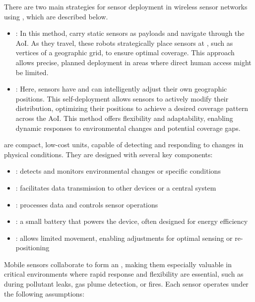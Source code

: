 \documentclass[a4paper, 12pt]{report}
\begin{document}
    There are two main strategies for sensor deployment in wireless sensor networks using , which are described below.

    \begin{itemize}
        \item {}: In this method,  carry static sensors as payloads and navigate through the AoI. As they travel, these robots strategically place sensors at , such as vertices of a geographic grid, to ensure optimal coverage. This approach allows precise, planned deployment in areas where direct human access might be limited.
        \item {}: Here, sensors have  and can intelligently adjust their own geographic positions. This self-deployment allows sensors to actively modify their distribution, optimizing their positions to achieve a desired coverage pattern across the AoI. This method offers flexibility and adaptability, enabling dynamic responses to environmental changes and potential coverage gaps.
    \end{itemize}

     are compact, low-cost units, capable of detecting and responding to changes in physical conditions. They are designed with several key components:

    \begin{itemize}
        \item {}: detects and monitors environmental changes or specific conditions
        \item {}: facilitates data transmission to other devices or a central system
        \item {}: processes data and controls sensor operations
        \item {}: a small battery that powers the device, often designed for energy efficiency
        \item {}: allows limited movement, enabling adjustments for optimal sensing or re-positioning
    \end{itemize}

    Mobile sensors collaborate to form an , making them especially valuable in critical environments where rapid response and flexibility are essential, such as during pollutant leaks, gas plume detection, or fires. Each sensor operates under the following assumptions:
\end{document}
